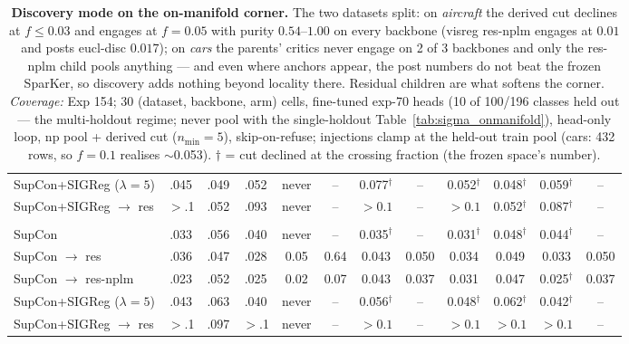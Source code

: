 \begin{table}[t]
\begin{tabular}{lccccccccccc}
SupCon+SIGReg ($\lambda{=}5$) & .045 & .049 & .052 & never & -- & 0.077$^\dagger$ & -- & 0.052$^\dagger$ & 0.048$^\dagger$ & 0.059$^\dagger$ & -- \\
\quad SupCon+SIGReg $\to$ res & $>$.1 & .052 & .093 & never & -- & $>0.1$ & -- & $>0.1$ & 0.052$^\dagger$ & 0.087$^\dagger$ & -- \\
\addlinespace
\multicolumn{12}{l}{\quad\emph{dino}} \\
SupCon & .033 & .056 & .040 & never & -- & 0.035$^\dagger$ & -- & 0.031$^\dagger$ & 0.048$^\dagger$ & 0.044$^\dagger$ & -- \\
\quad SupCon $\to$ res & .036 & .047 & .028 & 0.05 & 0.64 & 0.043 & 0.050 & 0.034 & 0.049 & 0.033 & 0.050 \\
\quad SupCon $\to$ res-nplm & .023 & .052 & .025 & 0.02 & 0.07 & 0.043 & 0.037 & 0.031 & 0.047 & 0.025$^\dagger$ & 0.037 \\
SupCon+SIGReg ($\lambda{=}5$) & .043 & .063 & .040 & never & -- & 0.056$^\dagger$ & -- & 0.048$^\dagger$ & 0.062$^\dagger$ & 0.042$^\dagger$ & -- \\
\quad SupCon+SIGReg $\to$ res & $>$.1 & .097 & $>$.1 & never & -- & $>0.1$ & -- & $>0.1$ & $>0.1$ & $>0.1$ & -- \\
\bottomrule
\end{tabular}
\caption{\textbf{Discovery mode on the on-manifold corner.}  The two datasets split: on \emph{aircraft} the derived cut declines at $f\le0.03$ and engages at $f{=}0.05$ with purity $0.54$--$1.00$ on every backbone (visreg res-nplm engages at $0.01$ and posts eucl-disc $0.017$); on \emph{cars} the parents' critics never engage on 2 of 3 backbones and only the res-nplm child pools anything --- and even where anchors appear, the post numbers do not beat the frozen SparKer, so discovery adds nothing beyond locality there.  Residual children are what softens the corner. \emph{Coverage:} Exp 154; 30 (dataset, backbone, arm) cells, fine-tuned exp-70 heads (10 of 100/196 classes held out --- the multi-holdout regime; never pool with the single-holdout Table~\ref{tab:sigma_onmanifold}), head-only loop, np pool + derived cut ($n_{\min}{=}5$), skip-on-refuse; injections clamp at the held-out train pool (cars: 432 rows, so $f{=}0.1$ realises $\sim$0.053).  $\dagger$ = cut declined at the crossing fraction (the frozen space's number).}
\label{tab:sigma_onmanifold_post}
\end{table}
